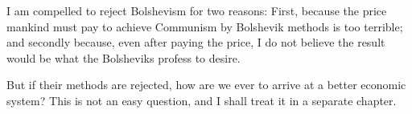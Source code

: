 I am compelled to reject Bolshevism for two reasons: First, because the price mankind must pay to achieve Communism by Bolshevik methods is too terrible; and secondly because, even after paying the price, I do not believe the result would be what the Bolsheviks profess to desire.

But if their methods are rejected, how are we ever to arrive at a better economic system? This is not an easy question, and I shall treat it in a separate chapter.